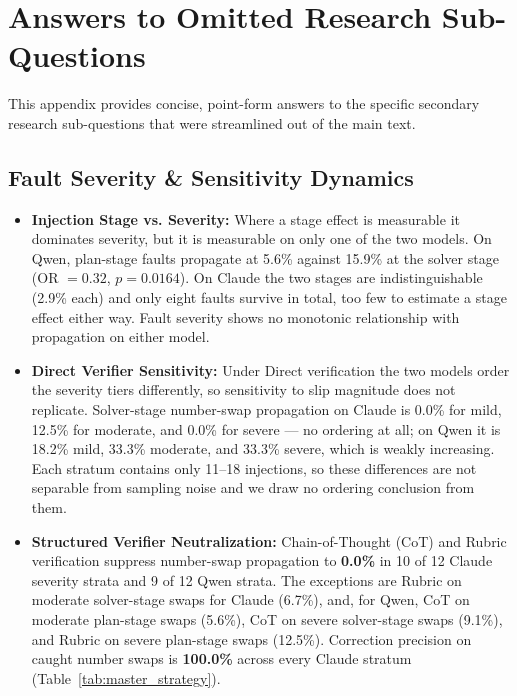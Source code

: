 \documentclass[11pt]{article}
\begin{document}
\clearpage

\section{Answers to Omitted Research Sub-Questions}\label{sec:appendix_answers}

This appendix provides concise, point-form answers to the specific secondary research sub-questions that were streamlined out of the main text.

\subsection{Fault Severity \& Sensitivity Dynamics}
\begin{itemize}
    \item \textbf{Injection Stage vs. Severity:} Where a stage effect is measurable it dominates severity, but it is measurable on only one of the two models. On Qwen, plan-stage faults propagate at 5.6\% against 15.9\% at the solver stage (OR $=0.32$, $p=0.0164$). On Claude the two stages are indistinguishable (2.9\% each) and only eight faults survive in total, too few to estimate a stage effect either way. Fault severity shows no monotonic relationship with propagation on either model.
    \item \textbf{Direct Verifier Sensitivity:} Under Direct verification the two models order the severity tiers differently, so sensitivity to slip magnitude does not replicate. Solver-stage number-swap propagation on Claude is 0.0\% for mild, 12.5\% for moderate, and 0.0\% for severe --- no ordering at all; on Qwen it is 18.2\% mild, 33.3\% moderate, and 33.3\% severe, which is weakly increasing. Each stratum contains only 11--18 injections, so these differences are not separable from sampling noise and we draw no ordering conclusion from them.
    \item \textbf{Structured Verifier Neutralization:} Chain-of-Thought (CoT) and Rubric verification suppress number-swap propagation to \textbf{0.0\%} in 10 of 12 Claude severity strata and 9 of 12 Qwen strata. The exceptions are Rubric on moderate solver-stage swaps for Claude (6.7\%), and, for Qwen, CoT on moderate plan-stage swaps (5.6\%), CoT on severe solver-stage swaps (9.1\%), and Rubric on severe plan-stage swaps (12.5\%). Correction precision on caught number swaps is \textbf{100.0\%} across every Claude stratum (Table~\ref{tab:master_strategy}).
\end{itemize}
\end{document}
